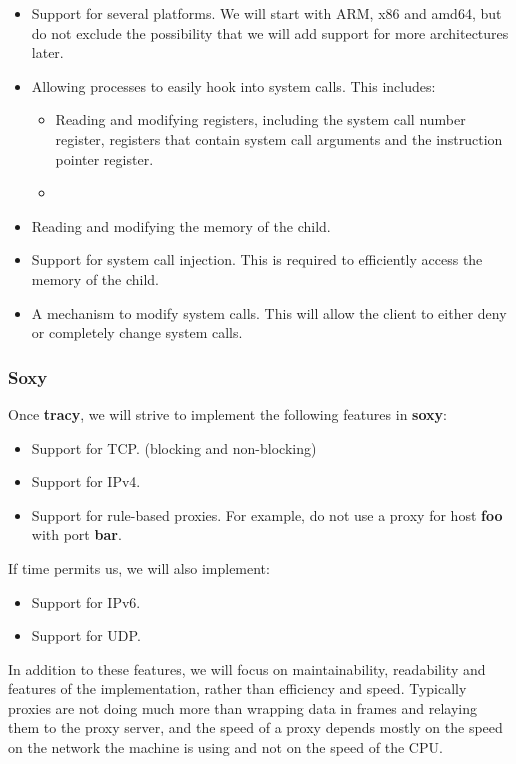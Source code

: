 \documentclass[a4paper]{article}
\begin{document}
\begin{itemize}
\item Support for several platforms. We will start with ARM, x86 and amd64, but
do not exclude the possibility that we will add support for more architectures
later.

\item Allowing processes to easily hook into system calls. This includes:
    \begin{itemize}
    \item Reading and modifying registers, including the system call number
    register, registers that contain system call arguments and the instruction
    pointer register.
    \item 
    \end{itemize}

\item Reading and modifying the memory of the child.

\item Support for system call injection. This is required to efficiently
access the memory of the child.

\item A mechanism to modify system calls. This will allow the client to
either deny or completely change system calls.
\end{itemize}

\subsubsection{Soxy}
Once \textbf{tracy}, we will strive to implement the following
features in \textbf{soxy}:

\begin{itemize}
\item Support for TCP. (blocking and non-blocking)
\item Support for IPv4.
\item Support for rule-based proxies. For example, do not use a proxy for
host \textbf{foo} with port \textbf{bar}.
\end{itemize}

If time permits us, we will also implement:

\begin{itemize}
\item Support for IPv6.
\item Support for UDP.
\end{itemize}

In addition to these features, we will focus on maintainability, readability
and features of the implementation, rather than efficiency and speed.
Typically proxies are not doing much more than wrapping data in frames and
relaying them to the proxy server, and the speed of a proxy depends mostly
on the speed on the network the machine is using and not on the speed of
the CPU.
\end{document}
